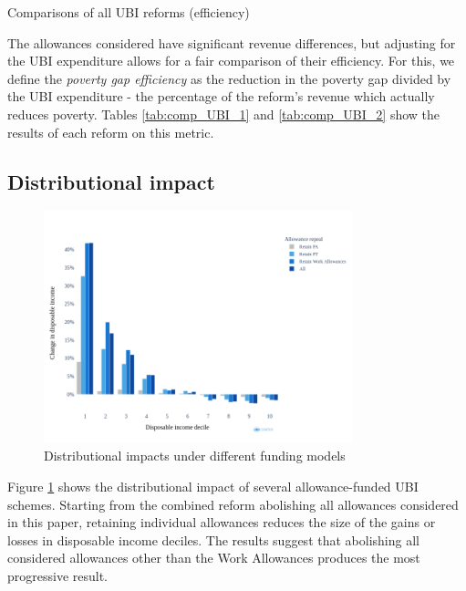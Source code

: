 \documentclass{article}
\begin{document}
    \begin{table}[h]
        \centering
        
        \caption{Comparisons of all UBI reforms (efficiency)}
        \label{tab:comp_UBI_2}
    \end{table}

    The allowances considered have significant revenue differences, but adjusting for the UBI expenditure allows for a fair comparison of their efficiency. For this, we define the \emph{poverty gap efficiency} as the reduction in the poverty gap divided by the UBI expenditure - the percentage of the reform's revenue which actually reduces poverty. Tables \ref{tab:comp_UBI_1} and \ref{tab:comp_UBI_2} show the results of each reform on this metric.
    \subsection{Distributional impact}

    \begin{figure}
        \centering
        \includegraphics[width=0.8\textwidth]{images/fig_13.png}
        \caption{Distributional impacts under different funding models}
        \label{fig:distr_comp}
    \end{figure}

    Figure \ref{fig:distr_comp} shows the distributional impact of several allowance-funded UBI schemes. Starting from the combined reform abolishing all allowances considered in this paper, retaining individual allowances reduces the size of the gains or losses in disposable income deciles.  The results suggest that abolishing all considered allowances other than the Work Allowances produces the most progressive result.
\end{document}
